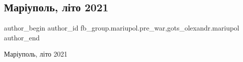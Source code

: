  
 
 
 
 

\subsection{Маріуполь, літо 2021}
\label{sec:12_02_2023.fb.fb_group.mariupol.pre_war.10.mar_upol__l_to_2021}
 
\ifcmt
 author_begin
   author_id fb_group.mariupol.pre_war,gots_olexandr.mariupol
 author_end
\fi

Маріуполь, літо 2021
